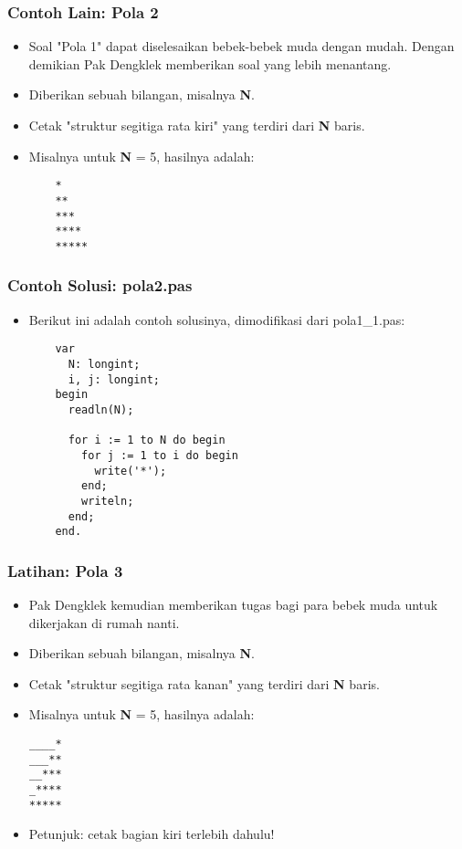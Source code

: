 \begin{frame}[fragile]
\frametitle{Contoh Lain: Pola 2}
\begin{itemize}
  \item Soal "Pola 1" dapat diselesaikan bebek-bebek muda dengan mudah. Dengan demikian Pak Dengklek memberikan soal yang lebih menantang.
  \item Diberikan sebuah bilangan, misalnya \textbf{N}.
  \item Cetak "struktur segitiga rata kiri" yang terdiri dari \textbf{N} baris.
  \item Misalnya untuk \textbf{N} = 5, hasilnya adalah:
  \begin{lstlisting}
    *
    **
    ***
    ****
    *****
  \end{lstlisting}
\end{itemize}
\end{frame}

\begin{frame}[fragile]
\frametitle{Contoh Solusi: pola2.pas}
\begin{itemize}
  \item Berikut ini adalah contoh solusinya, dimodifikasi dari pola1\_1.pas:
  \begin{lstlisting}
    var
      N: longint;
      i, j: longint;
    begin
      readln(N);

      for i := 1 to N do begin
        for j := 1 to i do begin
          write('*');
        end;
        writeln;
      end;
    end.
  \end{lstlisting}
\end{itemize}
\end{frame}

\begin{frame}[fragile]
\frametitle{Latihan: Pola 3}
\begin{itemize}
  \item Pak Dengklek kemudian memberikan tugas bagi para bebek muda untuk dikerjakan di rumah nanti.
  \item Diberikan sebuah bilangan, misalnya \textbf{N}.
  \item Cetak "struktur segitiga rata kanan" yang terdiri dari \textbf{N} baris.
  \item Misalnya untuk \textbf{N} = 5, hasilnya adalah:
\begin{lstlisting}
____*
___**
__***
_****
*****
\end{lstlisting}
  \item Petunjuk: cetak bagian kiri terlebih dahulu!
\end{itemize}
\end{frame}

